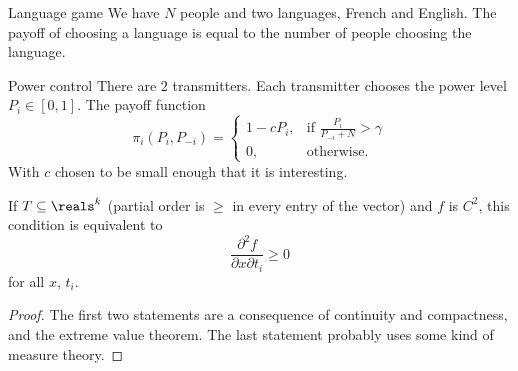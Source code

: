 \begin{aexample}{Language game}{}
    We have $N$ people and two languages, French and English. The payoff of choosing a language is equal to the number of people choosing the language. 
\end{aexample}


\begin{aexample}{Power control}{}
    There are $2$ transmitters. Each transmitter chooses the power level $P_i\in[0,1]$. The payoff function \[
    \pi_i(P_i,P_{-i}) = \begin{cases}
        1-cP_i, &\textrm{if $\frac{P_i}{P_{-i}+N}>\gamma$}\\
        0, &\textrm{otherwise}.
    \end{cases}
    \]With $c$ chosen to be small enough that it is interesting.
\end{aexample}

\begin{remark}
    If $T\subseteq \reals^k$ (partial order is $\geq$ in every entry of the vector) and $f$ is $C^2$, this condition is equivalent to \[
        \frac{\partial^2 f}{\partial x \partial t_i}\geq 0
    \]
    for all $x$, $t_i$.
\end{remark}

\begin{proof}
    The first two statements are a consequence of continuity and compactness, and the extreme value theorem.
    The last statement probably uses some kind of measure theory.
\end{proof}

